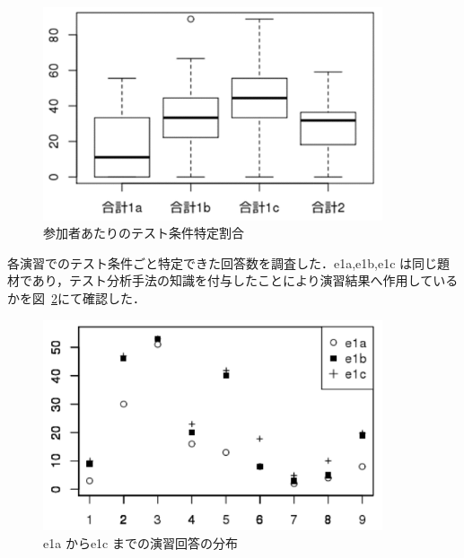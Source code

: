 \documentclass[a4paper,12pt]{jreport}
\begin{document}
\begin{figure}[h]
  \begin{center}
  \includegraphics[width=10cm]{./image/D-3-Fig11.png}
  \caption{参加者あたりのテスト条件特定割合}
  \label{fig:D-3-Fig11}
  \end{center}
   \end{figure}


各演習でのテスト条件ごと特定できた回答数を調査した．e1a,e1b,e1c は同じ題材であり，テスト分析手法の知識を付与したことにより演習結果へ作用しているかを図~\ref{fig:D-3-Fig12}にて確認した．
\begin{figure}[h]
  \begin{center}
  \includegraphics[width=10cm]{./image/D-3-Fig12.png}
  \caption{e1a からe1c までの演習回答の分布}
  \label{fig:D-3-Fig12}
  \end{center}
   \end{figure}
\end{document}
